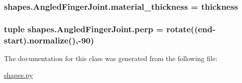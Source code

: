 \subsubsection[{material\+\_\+thickness}]{\setlength{\rightskip}{0pt plus 5cm}shapes.\+Angled\+Finger\+Joint.\+material\+\_\+thickness = thickness\hspace{0.3cm}{\ttfamily [static]}}\label{classshapes_1_1_angled_finger_joint_a3c19348b7cc2e158b580b9701c5d1612}
\hypertarget{classshapes_1_1_angled_finger_joint_aca8911daca5c644771098e059c44ca4e}{}
\subsubsection[{perp}]{\setlength{\rightskip}{0pt plus 5cm}tuple shapes.\+Angled\+Finger\+Joint.\+perp = rotate((end-\/start).normalize(),-\/90)\hspace{0.3cm}{\ttfamily [static]}}\label{classshapes_1_1_angled_finger_joint_aca8911daca5c644771098e059c44ca4e}


The documentation for this class was generated from the following file\+:\begin{DoxyCompactItemize}
\item 
\hyperlink{shapes_8py}{shapes.\+py}\end{DoxyCompactItemize}
